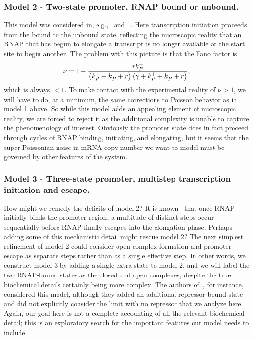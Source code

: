 \subsubsection{Model 2 - Two-state promoter, RNAP bound or unbound.}
This model was considered in, e.g.,~\cite{Phillips2015a} and
~\cite{Phillips2019}. Here transcription initiation proceeds from the bound to
the unbound state, reflecting the microscopic reality that an RNAP that has
begun to elongate a transcript is no longer available at the start site to begin
another. The problem with this picture is that the Fano factor is
\begin{align}
    \nu = 1 -
        \frac{r{k}_{P}^{+}}
            {\left({k}_{P}^{+} + {k}_{P}^{-} + r\right)
             \left(\gamma + {k}_{P}^{+} + {k}_{P}^{-} + r\right)},
\end{align}
which is always $<1$. To make contact with the experimental reality of $\nu>1$,
we will have to do, at a minimum, the same corrections to Poisson behavior as in
model 1 above. So while this model adds an appealing element of microscopic
reality, we are forced to reject it as the additional complexity is unable to
capture the phenomenology of interest. Obviously the promoter state does in fact
proceed through cycles of RNAP binding, initiating, and elongating, but it seems
that the super-Poissonian noise in mRNA copy number we want to model must be
governed by other features of the system.

\subsubsection{Model 3 - Three-state promoter, multistep transcription
initiation and escape.} How might we remedy the deficits of model 2? It is
known~\cite{DeHaseth1998} that once RNAP initially binds the promoter region, a
multitude of distinct steps occur sequentially before RNAP finally escapes into
the elongation phase. Perhaps adding some of this mechanistic detail might
rescue model 2? The next simplest refinement of model 2 could consider open
complex formation and promoter escape as separate steps rather than as a single
effective step. In other words, we construct model 3 by adding a single extra
state to model 2, and we will label the two RNAP-bound states as the closed and
open complexes, despite the true biochemical details certainly being more
complex. The authors of~\cite{Mitarai2015}, for instance, considered this model,
although they added an additional repressor bound state and did not explicitly
consider the limit with no repressor that we analyze here. Again, our goal here
is not a complete accounting of all the relevant biochemical detail; this is an
exploratory search for the important features our model needs to include.

